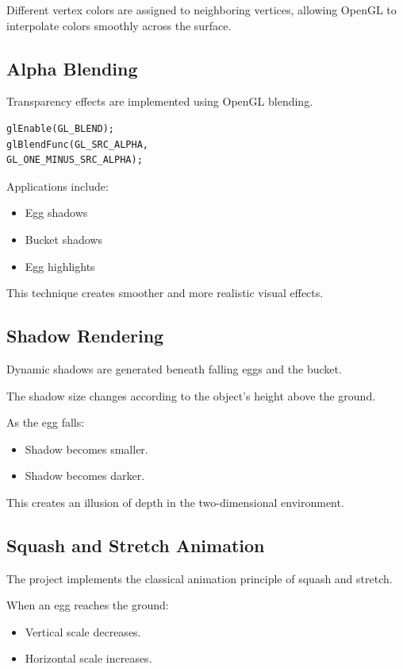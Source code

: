 \documentclass[12pt,a4paper]{report}
\begin{document}
Different vertex colors are assigned to neighboring vertices, allowing OpenGL to interpolate colors smoothly across the surface.

\subsection*{Alpha Blending}

Transparency effects are implemented using OpenGL blending.

\begin{verbatim}
glEnable(GL_BLEND);
glBlendFunc(GL_SRC_ALPHA,
GL_ONE_MINUS_SRC_ALPHA);
\end{verbatim}

Applications include:

\begin{itemize}
\item Egg shadows
\item Bucket shadows
\item Egg highlights
\end{itemize}

This technique creates smoother and more realistic visual effects.

\subsection*{Shadow Rendering}

Dynamic shadows are generated beneath falling eggs and the bucket.

The shadow size changes according to the object's height above the ground.

As the egg falls:

\begin{itemize}
\item Shadow becomes smaller.
\item Shadow becomes darker.
\end{itemize}

This creates an illusion of depth in the two-dimensional environment.

\subsection*{Squash and Stretch Animation}

The project implements the classical animation principle of squash and stretch.

When an egg reaches the ground:

\begin{itemize}
\item Vertical scale decreases.
\item Horizontal scale increases.
\end{itemize}
\end{document}
